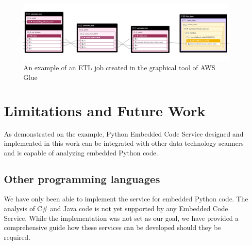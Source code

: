 \begin{figure}[ht]\centering
\includegraphics[angle=90,origin=c,height=1.0\textwidth]{img/thesis_demo4.PNG}
\caption{An example of an ETL job created in the graphical tool of AWS Glue}
\label{fig:thesisDemo4}
\end{figure}

\section{Limitations and Future Work}

As demonstrated on the example, Python Embedded Code Service designed and implemented in this work can be integrated with other data technology scanners and is capable of analyzing embedded Python code.

\subsection{Other programming languages}
We have only been able to implement the service for embedded Python code. The analysis of C\# and Java code is not yet supported by any Embedded Code Service. While the implementation was not set as our goal, we have provided a comprehensive guide how these services can be developed should they be required.

